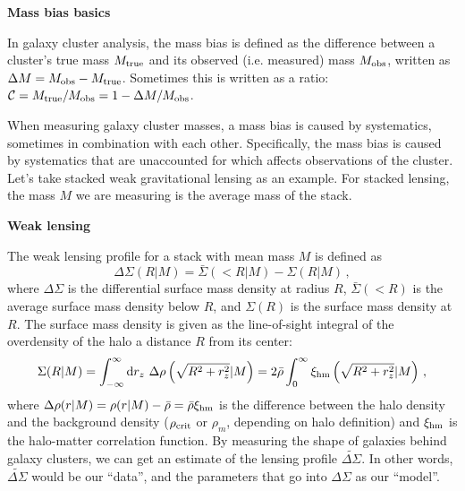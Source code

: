 \documentclass[12pt]{article}
\newcommand{\wds}{\widetilde{\Delta\Sigma}}
\newcommand{\ds}{\Delta\Sigma}
\begin{document}
\noindent
{\bf Mass bias basics}

In galaxy cluster analysis, the mass bias is defined as the difference between a cluster's true mass $M_{\rm true}$ and its observed (i.e. measured) mass $M_{\rm obs}$, written as $\Delta M = M_{\rm obs}-M_{\rm true}$. Sometimes this is written as a ratio: $\mathcal{C} = M_{\rm true}/M_{\rm obs} = 1-\Delta M/M_{\rm obs}$.

When measuring galaxy cluster masses, a mass bias is caused by systematics, sometimes in combination with each other. Specifically, the mass bias is caused by systematics that are unaccounted for which affects observations of the cluster. Let's take stacked weak gravitational lensing as an example. For stacked lensing, the mass $M$ we are measuring is the average mass of the stack.

\vspace{12pt}
\noindent
{\bf Weak lensing}

The weak lensing profile for a stack with mean mass $M$ is defined as 
%
\begin{equation}
	\label{eq:deltasigma_def}
	\Delta\Sigma(R|M) = \bar{\Sigma}(<R|M) - \Sigma(R|M)\,,
\end{equation}
%
where $\Delta\Sigma$ is the differential surface mass density at radius $R$, $\bar{\Sigma}(<R)$ is the average surface mass density below $R$, and $\Sigma(R)$ is the surface mass density at $R$. The surface mass density is given as the line-of-sight integral of the overdensity of the halo a distance $R$ from its center:
%
\begin{equation}
	\label{eq:sigma_def}
	\Sigma(R|M) = \int_{-\infty}^{\infty} {\rm d}r_z\ \Delta\rho\left(\sqrt{R^2+r_z^2}|M\right) = 2\bar{\rho}\int_0^\infty \xi_{\rm hm}\left(\sqrt{R^2+r_z^2}|M\right)\,,
\end{equation}
%
where $\Delta\rho(r|M) = \rho(r|M) - \bar{\rho} = \bar{\rho}\xi_{\rm hm}$ is the difference between the halo density and the background density ($\rho_{\rm crit}$ or $\rho_{m}$, depending on halo definition) and $\xi_{\rm hm}$ is the halo-matter correlation function. By measuring the shape of galaxies behind galaxy clusters, we can get an estimate of the lensing profile $\wds$. In other words, $\wds$ would be our ``data'', and the parameters that go into $\ds$ as our ``model''.
\end{document}
